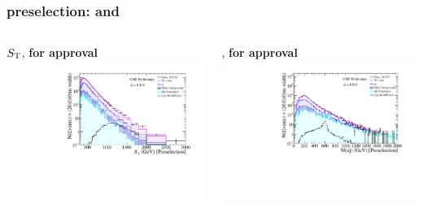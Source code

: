 \documentclass[bigger]{beamer}
\providecommand{\alert}[1]{\textbf{#1}}
\begin{document}
\begin{frame}
\frametitle{\enujj preselection: \ST and \mej}
\label{sec-3-1-5}
\begin{columns}
\begin{column}{0.6\textwidth}
\label{sec-3-1-5-1}

\centering
$S_{\text{T}}$, \alert{for approval}
\includegraphics[width=\textwidth]{fig/enu/preselection_noRatio/sT_PAS_enujj.pdf}
\end{column}
\begin{column}{0.6\textwidth}
\label{sec-3-1-5-2}

\centering
\mej, \alert{for approval}
\includegraphics[width=\textwidth]{fig/enu/preselection_noRatio/Mej_PAS_enujj.pdf}
\end{column}
\end{columns}
\end{frame}
\end{document}
